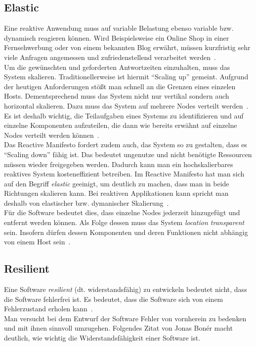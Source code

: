 \subsection{Elastic}\label{subsec:elastic}
Eine reaktive Anwendung muss auf variable Belastung ebenso variable bzw. dynamisch reagieren können. Wird Beispielsweise ein Online Shop in einer Fernsehwerbung oder von einem bekannten Blog erwährt, müssen kurzfristig sehr viele Anfragen angemessen und zufriedenstellend verarbeitet werden~\cite[S.~39]{kuhn_reactive_2015}.\\
Um die gewünschten und geforderten Antwortzeiten einzuhalten, muss das System skalieren. Traditionellerweise ist hiermit \enquote{Scaling up} gemeint. Aufgrund der heutigen Anforderungen stößt man schnell an die Grenzen eines einzelen Hosts. Dementsprechend muss das System nicht nur vertikal sondern auch horizontal skalieren. Dazu muss das System auf mehrere Nodes verteilt werden~\cite[S.~7]{vernon_reactive_2016}. Es ist deshalb wichtig, die Teilaufgaben eines Systems zu identifizieren und auf einzelne Komponenten aufzuteilen, die dann wie bereits erwähnt auf einzelne Nodes verteilt werden können~\cite[S.~40]{kuhn_reactive_2015}.\\
Das Reactive Manifesto fordert zudem auch, das System so zu gestalten, dass es \enquote{Scaling down} fähig ist. Das bedeutet ungenutze und nicht benötigte Ressourcen müssen wieder freigegeben werden. Dadurch kann man ein hochskalierbares reaktives System kosteneffizient betreiben. Im Reactive Manifesto hat man sich auf den Begriff \textit{elastic} geeinigt, um deutlich zu machen, dass man in beide Richtungen skalieren kann. Bei reaktiven Applikationen kann spricht man deshalb von elastischer bzw. dymanischer Skalierung~\cite[S.~8]{vernon_reactive_2016}.\\
Für die Software bedeutet dies, dass einzelne Nodes jederzeit hinzugefügt und entfernt werden können. Als Folge dessen muss das System \textit{location transparent} sein. Insofern dürfen dessen Komponenten und deren Funktionen nicht abhängig von einem Host sein~\cite[S.~8]{vernon_reactive_2016}. 


\pagebreak

\subsection{Resilient}\label{subsec:resilient}
Eine Software \textit{resilient} (dt. widerstandsfähig) zu entwickeln bedeutet nicht, dass die Software fehlerfrei ist. Es bedeutet, dass die Software sich von einem Fehlerzustand erholen kann~\cite[S.~6]{vernon_reactive_2016}.\\
Man versucht bei dem Entwurf der Software Fehler von vornherein zu bedenken und mit ihnen sinnvoll umzugehen. Folgendes Zitat von Jonas Bonér macht deutlich, wie wichtig die Widerstandsfähigkeit einer Software ist.

